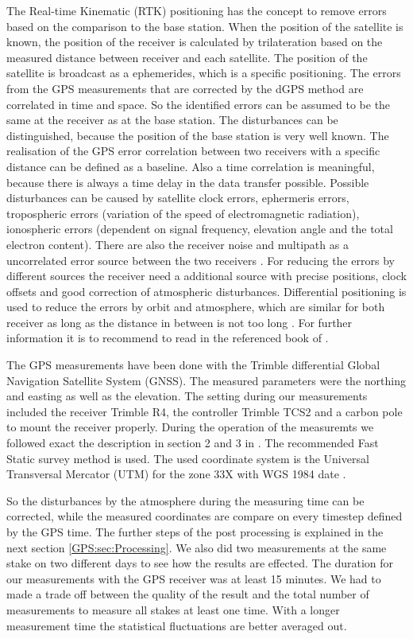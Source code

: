 The Real-time Kinematic (RTK) positioning has the concept to remove errors based on the comparison to the base station.
When the position of the satellite is known, the position of the receiver is calculated by trilateration based on the measured distance between receiver and each satellite.
The position of the satellite is broadcast as a ephemerides, which is a specific positioning.
The errors from the GPS measurements that are corrected by the dGPS method are correlated in time and space.
So the identified errors can be assumed to be the same at the receiver as at the base station.
The disturbances can be distinguished, because the position of the base station is very well known.
The realisation of the GPS error correlation between two receivers with a specific distance can be defined as a baseline.
Also a time correlation is meaningful, because there is always a time delay in the data transfer possible.
Possible disturbances can be caused by satellite clock errors, ephermeris errors, tropospheric errors (variation of the speed of electromagnetic radiation), ionospheric errors (dependent on signal frequency, elevation angle and the total electron content). 
There are also the receiver noise and multipath as a uncorrelated error source between the two receivers \citep{UGPS}.
For reducing the errors by different sources the receiver need a additional source with precise positions, clock offsets and good correction of atmospheric disturbances. 
Differential positioning is used to reduce the errors by orbit and atmosphere, which are similar for both receiver as long as the distance in between is not too long \citep{Trprocess}.
For further information it is to recommend to read in the referenced book of \citep{UGPS}.
\medskip

The GPS measurements have been done with the Trimble differential Global Navigation Satellite System (GNSS). 
The measured parameters were the northing and easting as well as the elevation. 
The setting during our measurements included the receiver Trimble R4,
the controller Trimble TCS2 and a carbon pole to mount the receiver properly.
During the operation of the measuremts we followed exact the description in section 2 and 3 in \cite{Trquickstart}. 
The recommended Fast Static survey method is used.
The used coordinate system is the Universal Transversal Mercator (UTM) for the zone 33X with WGS 1984 date \citep{Trquickstart}. 
\medskip

So the disturbances by the atmosphere during the measuring time can be corrected, while the measured coordinates are compare on every timestep defined by the GPS time.
The further steps of the post processing is explained in the next section \ref{GPS:sec:Processing}.
We also did two measurements at the same stake on two different days to see how the results are effected.
The duration for our measurements with the GPS receiver was at least 15 minutes. 
We had to made a trade off between the quality of the result and the total number of
measurements to measure all stakes at least one time. 
With a longer measurement time the statistical fluctuations are better averaged out.
\medskip

